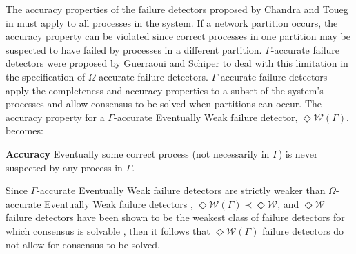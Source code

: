 The accuracy properties of the failure detectors proposed by Chandra and Toueg in \cite{DeepakChandra1996} must apply to all processes in the system. If a network partition occurs, the accuracy property can be violated since correct processes in one partition may be suspected to have failed by processes in a different  partition. $\Gamma$-accurate failure detectors were proposed by Guerraoui and Schiper \cite{Guerraoui96gammaaccurate} to deal with this limitation in the specification of $\Omega$-accurate failure detectors. $\Gamma$-accurate failure detectors apply the completeness and accuracy properties to a subset of the system's processes and allow consensus to be solved when partitions can occur. The accuracy property for a $\Gamma$-accurate Eventually Weak failure detector, $\Diamond\mathcal{W}(\Gamma)$, becomes: \par
\textbf{Accuracy} Eventually some correct process (not necessarily in $\Gamma$) is never suspected by any process in $\Gamma$.\par
Since $\Gamma$-accurate Eventually Weak failure detectors are strictly weaker than $\Omega$-accurate Eventually Weak failure detectors \cite{Guerraoui96gammaaccurate}, $\Diamond\mathcal{W}(\Gamma) \prec \Diamond\mathcal{W}$, and  $\Diamond\mathcal{W}$ failure detectors have been shown to be the weakest class of failure detectors for which consensus is solvable \cite{Chandra1996}, then it follows that $\Diamond\mathcal{W}(\Gamma)$ failure detectors do not allow for consensus to be solved.\par
